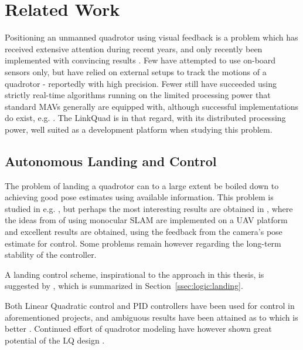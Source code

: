 \section{Related Work}
\label{sec:previouswork}

    Positioning an unmanned quadrotor using
    visual feedback is a problem which has received extensive attention
    during recent years, and only recently been implemented with convincing
    results \citep{DBLP:conf/icra/BloschWSS10,weiss11monocular}.
    Few have attempted to use on-board sensors only, but have relied on
    external setups to track the motions of a quadrotor - reportedly with high precision.
    Fewer still have succeeded using strictly real-time algorithms
    running on the limited processing power that standard
    MAVs generally are equipped with, although successful implementations do exist, e.g. \citep{Rudol10}.
    The LinkQuad is in that regard, with its distributed processing power, well suited
    as a development platform when studying this problem.

    \subsection{Autonomous Landing and Control}
    The problem of landing a quadrotor can to a large extent be boiled
    down to achieving good pose estimates using available information.
    This problem is studied in e.g. \citep{mellinger10perching,brockers:803111},
    but perhaps the most interesting results are obtained in \citep{DBLP:conf/icra/BloschWSS10,weiss11monocular},
    where the ideas from \citep{klein07parallel} of using monocular SLAM
    are implemented on a UAV platform and excellent results are obtained,
    using the feedback from the camera's pose estimate for control.
    Some problems remain however regarding the long-term stability of the controller.

    A landing control scheme, inspirational to the approach in this thesis,
    is suggested by \citep{brockers:803111}, which is summarized in Section~\ref{ssec:logic:landing}.

    Both Linear Quadratic control and PID controllers have been used for control
    in aforementioned projects, and ambiguous results have been attained
    as to which is better \citep{bouabdallah04pid}. Continued effort of
    quadrotor modeling have however shown great potential of the LQ design \citep{bouabdallah07full}.

